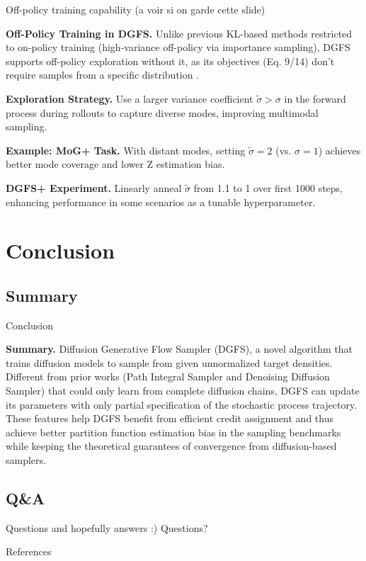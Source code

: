 \documentclass[aspectratio=169,xcolor=dvipsnames]{beamer}
\begin{document}
\begin{frame}[t]{Off-policy training capability (a voir si on garde cette slide)}
\footnotesize

\textbf{Off-Policy Training in DGFS.} Unlike previous KL-based methods restricted to on-policy training (high-variance off-policy via importance sampling), DGFS supports off-policy exploration without it, as its objectives (Eq. 9/14) don't require samples from a specific distribution \cite{malkin2023,lahlou2023}.

\textbf{Exploration Strategy.} Use a larger variance coefficient \(\tilde{\sigma} > \sigma\) in the forward process during rollouts to capture diverse modes, improving multimodal sampling.

\textbf{Example: MoG+ Task.} With distant modes, setting \(\tilde{\sigma} = 2\) (vs. \(\sigma = 1\)) achieves better mode coverage and lower Z estimation bias.

\textbf{DGFS+ Experiment.} Linearly anneal \(\tilde{\sigma}\) from 1.1 to 1 over first 1000 steps, enhancing performance in some scenarios as a tunable hyperparameter.

\end{frame}



\section{Conclusion}

\subsection{Summary}
\begin{frame}{Conclusion}
\footnotesize

\textbf{Summary.} Diffusion Generative Flow Sampler (DGFS), a novel algorithm that trains diffusion models to sample from given unnormalized target densities. Different from prior works (Path Integral Sampler and Denoising Diffusion Sampler) that could only learn from complete diffusion chains, DGFS can update its parameters with only partial specification of the stochastic process trajectory. These features help DGFS benefit from efficient credit assignment and thus achieve better partition function estimation bias in the sampling benchmarks while keeping the theoretical guarantees of convergence from diffusion-based samplers.

\end{frame}

\subsection{Q\&A}

\begin{frame}{Questions and hopefully answers :)}
    \centering
    \Huge Questions?
\end{frame}

\begin{frame}[allowframebreaks]{References}
\footnotesize
\printbibliography
\end{frame}
\end{document}
